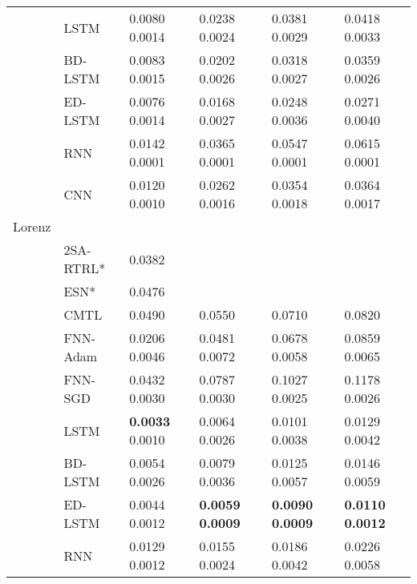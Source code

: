\documentclass[final,5p,times,twocolumn]{elsarticle}
\begin{document}
\begin{table*}[htbp!]
\begin{tabular}{llllll}
&LSTM   &   0.0080	0.0014   	&    0.0238	0.0024    &0.0381	0.0029	       &0.0418	0.0033\\

&BD-LSTM   &   0.0083	0.0015   	&   0.0202	0.0026     &0.0318	0.0027	       &0.0359	0.0026\\

&ED-LSTM   &   0.0076	0.0014   	&    0.0168	0.0027    &	0.0248	0.0036       &0.0271	0.0040\\

&RNN  &    0.0142	0.0001  	&   0.0365	0.0001     &0.0547	0.0001	       &0.0615	0.0001\\

&CNN &     0.0120		0.0010 	&   0.0262		0.0016     &0.0354		0.0018	       &0.0364		0.0017\\

\hline





Lorenz &    	   &	& \\
 


 &2SA-RTRL*\cite{chang2012reinforced}  &  0.0382	   &	 &  \\



 &ESN*\cite{chang2012reinforced}&    0.0476 	   &	&   \\
 
 &CMTL \cite{chandra2017CMTLMulti} & 0.0490	 &  0.0550	&0.0710 & 0.0820  \\
&FNN-Adam &    0.0206	0.0046  	&  0.0481	0.0072      & 0.0678	0.0058	       &0.0859	0.0065\\

&FNN-SGD  & 0.0432	0.0030     	&   0.0787	0.0030     &0.1027	0.0025	       &0.1178	0.0026\\

&LSTM   & \textbf{0.0033}	0.0010     	&  0.0064	0.0026      &	0.0101	0.0038       &0.0129	0.0042\\

&BD-LSTM   & 0.0054	0.0026     	&  0.0079	0.0036      &0.0125	0.0057	       &0.0146	0.0059\\

&ED-LSTM   &0.0044	0.0012      	&  \textbf{0.0059	0.0009}      &\textbf{0.0090	0.0009}	       &\textbf{0.0110	0.0012}\\

&RNN  &   0.0129	0.0012   	& 0.0155	0.0024       &0.0186	0.0042	       &0.0226	0.0058\\


\end{tabular}
\end{table*}
\end{document}
